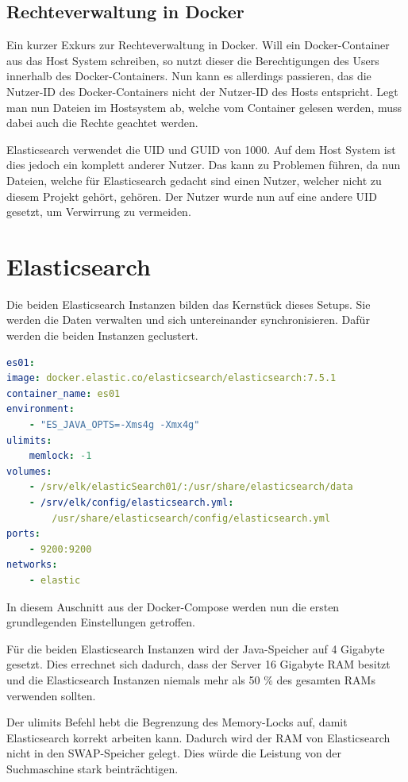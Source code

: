 \subsection{Rechteverwaltung in Docker}

Ein kurzer Exkurs zur Rechteverwaltung in Docker. Will ein Docker-Container aus das Host System schreiben, so nutzt dieser die Berechtigungen des Users innerhalb des Docker-Containers. Nun kann es allerdings passieren, das die Nutzer-ID des Docker-Containers nicht der Nutzer-ID des Hosts entspricht. Legt man nun Dateien im Hostsystem ab, welche vom Container gelesen werden, muss dabei auch die Rechte geachtet werden. 

Elasticsearch verwendet die UID und GUID von 1000. Auf dem Host System ist dies jedoch ein komplett anderer Nutzer. Das kann zu Problemen führen, da nun Dateien, welche für Elasticsearch gedacht sind einen Nutzer, welcher nicht zu diesem Projekt gehört, gehören. Der Nutzer wurde nun auf eine andere UID gesetzt, um Verwirrung zu vermeiden. \cite{JarrodWeaver.2014}

\section{Elasticsearch}

Die beiden Elasticsearch Instanzen bilden das Kernstück dieses Setups. Sie werden die Daten verwalten und sich untereinander synchronisieren. Dafür werden die beiden Instanzen geclustert.

\begin{lstlisting}[language=YAML, frame=single, label={lst:es01}] 
es01:
image: docker.elastic.co/elasticsearch/elasticsearch:7.5.1
container_name: es01
environment:
	- "ES_JAVA_OPTS=-Xms4g -Xmx4g"
ulimits:
	memlock: -1
volumes:
	- /srv/elk/elasticSearch01/:/usr/share/elasticsearch/data
	- /srv/elk/config/elasticsearch.yml:
		/usr/share/elasticsearch/config/elasticsearch.yml
ports:
	- 9200:9200
networks:
	- elastic
\end{lstlisting}

In diesem Auschnitt aus der Docker-Compose werden nun die ersten grundlegenden Einstellungen getroffen.

Für die beiden Elasticsearch Instanzen wird der Java-Speicher auf 4 Gigabyte gesetzt. Dies errechnet sich dadurch, dass der Server 16 Gigabyte RAM besitzt und die Elasticsearch Instanzen niemals mehr als 50 \% des gesamten RAMs verwenden sollten. \cite{ElasticsearchB.V..12172019}

Der ulimits Befehl hebt die Begrenzung des Memory-Locks auf, damit Elasticsearch korrekt arbeiten kann. Dadurch wird der RAM von Elasticsearch nicht in den SWAP-Speicher gelegt. Dies würde die Leistung von der Suchmaschine stark beinträchtigen.

